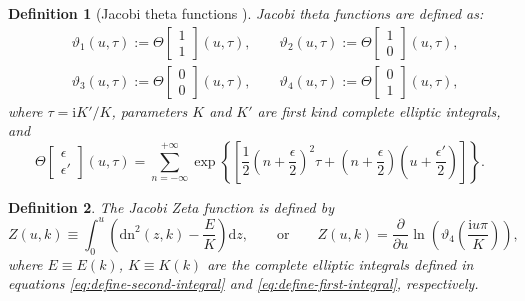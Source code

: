 \documentclass[11pt,reqno]{amsart}
\newcommand{\ii}{\mathrm{i}}
\newcommand{\dn}{\mathrm{dn}}
\newcommand{\dd}{\mathrm{d}}
\newtheorem{define}{Definition}
\numberwithin{equation}{section}
\begin{document}
\begin{define}[Jacobi theta functions {\cite[p.302]{Farkas-92-Riemann}}]\label{define:theta}
	Jacobi theta functions are defined as:
	\begin{equation}\nonumber
		\begin{split}
			&\vartheta_1(u, \tau):=\Theta\begin{bmatrix}
				1 \\ 1
			\end{bmatrix}(u,\tau), \qquad
			\vartheta_2(u, \tau):=\Theta\begin{bmatrix}
				1 \\ 0
			\end{bmatrix}(u,\tau), \\
			&\vartheta_3(u, \tau):=\Theta\begin{bmatrix}
				0 \\ 0
			\end{bmatrix}(u,\tau), \qquad
			\vartheta_4(u, \tau):=\Theta\begin{bmatrix}
				0 \\ 1
			\end{bmatrix}(u,\tau),
		\end{split}
	\end{equation}
	where $\tau=\ii K'/K$, parameters $K$ and $K'$ are first kind complete elliptic integrals, and
	\begin{equation}\nonumber
		\Theta\begin{bmatrix}
			\epsilon \\
			\epsilon'
		\end{bmatrix}(u,\tau)
		=\sum_{n=-\infty}^{+\infty}\exp\left\{ \left[\frac{1}{2}\left(n+\frac{\epsilon}{2}\right)^2\tau+\left(n+\frac{\epsilon}{2}\right)\left(u+\frac{\epsilon'}{2}\right)\right]\right\}.
	\end{equation}
\end{define}

\begin{define}\label{define:zeta}
	The Jacobi Zeta function is defined by 
	\begin{equation}\label{eq:Zeta-define}
		Z(u,k)\equiv \int_0^u \left( \dn^2(z,k)-\frac{E}{K} \right) \dd z, 
		\qquad \text{or} \qquad 
		Z(u,k)=\frac{\partial }{\partial u}\ln\left(\vartheta_4\left(\frac{\ii u\pi }{ K}\right)\right)\! ,
	\end{equation}
	where $E\equiv E(k)$, $K\equiv K(k)$ are the complete elliptic integrals defined in equations \eqref{eq:define-second-integral} and \eqref{eq:define-first-integral}, respectively.
\end{define}
\end{document}
